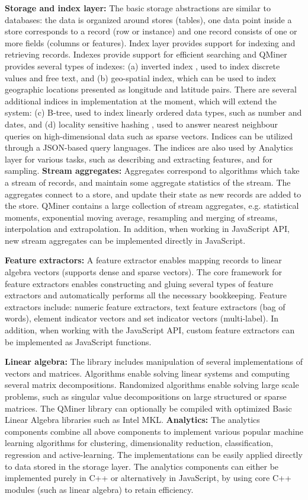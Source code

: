 \documentclass{article} %
\begin{document}
\textbf{Storage and index layer:} The basic storage abstractions are similar to databases: the data is organized around stores (tables), one data point inside a store corresponds to a record (row or instance) and one record consists of one or more fields (columns or features). Index layer provides support for indexing and retrieving records. Indexes provide support for efficient searching and QMiner provides several types of indexes: (a) inverted index \cite[section 6.5]{knuth1998taocp3}, used to index discrete values and free text, and (b) geo-spatial index, which can be used to index geographic locations presented as longitude and latitude pairs. There are several additional indices in implementation at the moment, which will extend the system: (c) B-tree, used to index linearly ordered data types, such as number and dates, and (d) locality sensitive hashing \cite{har2012approximate}, used to answer nearest neighbour queries on high-dimensional data such as sparse vectors. Indices can be utilized through a JSON-based query languages. The indices are also used by Analytics layer for various tasks, such as describing and extracting features, and for sampling.
\textbf{Stream aggregates:} Aggregates correspond to algorithms which take a stream of records, and maintain some aggregate statistics of the stream. The aggregates connect to a store, and update their state as new records are added to the store. QMiner contains a large collection of stream aggregates, e.g. statistical moments, exponential moving average, resampling and merging of streams, interpolation and extrapolation. In addition, when working in JavaScript API, new stream aggregates can be implemented directly in JavaScript.

\textbf{Feature extractors:} A feature extractor enables mapping records to linear algebra vectors (supports dense and sparse vectors). The core framework for feature extractors enables constructing and gluing several types of feature extractors and automatically performs all the necessary bookkeeping. Feature extractors include: numeric feature extractors, text feature extractors (bag of words), element indicator vectors and set indicator vectors (multi-label). In addition, when working with the JavaScript API, custom feature extractors can be implemented as JavaScript functions.

\textbf{Linear algebra:} The library includes manipulation of several implementations of vectors and matrices. Algorithms enable solving linear systems and computing several matrix decompositions. Randomized algorithms enable solving large scale problems, such as singular value decompositions\cite{tropp} on large structured or sparse matrices. The QMiner library can optionally
be compiled with optimized Basic Linear Algebra libraries such as Intel MKL.
\textbf{Analytics:} The analytics components combine all above components to implement various popular machine learning algorithms for clustering, dimensionality reduction, classification, regression and active-learning. The implementations can be easily applied directly to data stored in the storage layer. The analytics components can either be implemented purely in C++ or alternatively in JavaScript, by using core C++ modules (such as linear algebra) to retain efficiency.
\end{document}
